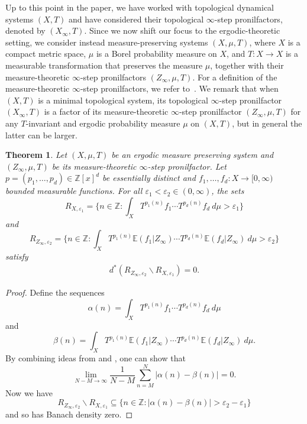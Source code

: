 \documentclass{article}
\theoremstyle{plain}
\newtheorem{theorem}[Theorem]{Theorem}
\theoremstyle{claim}
\theoremstyle{definition}
\theoremstyle{plain}
\theoremstyle{plain}
\newcommand{\Z}{\mathbb{Z}}
\renewcommand{\epsilon}{\varepsilon}
\renewcommand{\setminus}{\backslash}
\newcommand{\E}{\mathbb{E}}
\newcommand{\eps}{\epsilon}
\newcommand{\1}{\boldsymbol{1}}
\begin{document}
Up to this point in the paper, we have worked with topological dynamical systems $(X, T)$ and have considered their topological $\infty$-step pronilfactors, denoted by $(X_\infty, T)$.
Since we now shift our focus to the ergodic-theoretic setting, we consider instead measure-preserving systems $(X,\mu,T)$, where $X$ is a compact metric space, $\mu$ is a Borel probability measure on $X$, and $T\colon X\to X$ is a measurable transformation that preserves the measure $\mu$, together with their measure-theoretic $\infty$-step pronilfactors $(Z_\infty,\mu,T)$. For a definition of the measure-theoretic $\infty$-step pronilfactors, we refer to~\cite{Host_Kra18}.
We remark that when $(X,T)$ is a minimal topological system, its topological $\infty$-step pronilfactor $(X_\infty,T)$ is a factor of its measure-theoretic $\infty$-step pronilfactor $(Z_\infty,\mu,T)$ for any $T$-invariant and ergodic probability measure $\mu$ on $(X,T)$, but in general the latter can be larger.


\begin{theorem}
\label{thm_imperfect_ergodic_analogue_of_thm_a}
Let $(X, \mu, T)$ be an ergodic measure preserving system and $(Z_{\infty}, \mu, T)$ be its measure-theoretic $\infty$-step pronilfactor. Let $p = (p_1, \ldots, p_d) \in \Z[x]^d$ be essentially distinct and $f_1, \ldots, f_d: X \to [0,\infty)$ bounded measurable functions. For all $\eps_1<\eps_2\in (0,\infty)$, the sets
\[
    R_{X,\eps_1} = \bigg\{n \in \Z: \int_X T^{p_1(n)} f_1 \cdots T^{p_d(n)} f_d \ d \mu > \eps_1\bigg\}
\]
and
\[
    R_{Z_{\infty}, \eps_2} = \bigg\{n \in \Z: \int_X T^{p_1(n)} \E(f_1|Z_{\infty}) \cdots T^{p_d(n)} \E(f_d|Z_{\infty}) \ d \mu > \eps_2\bigg\}
\]
satisfy 
\begin{align}
\label{eqn_diff_of_msble_returns}
    d^*(R_{Z_{\infty}, \eps_2} \setminus R_{X,\eps_1}) = 0.
\end{align}
\end{theorem}

\begin{proof}
Define the sequences
\[
    \alpha(n) = \int_X T^{p_1(n)} f_1 \cdots T^{p_d(n)} f_d \ d \mu
\]
and
\[
    \beta(n) = \int_X T^{p_1(n)} \E(f_1|Z_{\infty}) \cdots T^{p_d(n)} \E(f_d|Z_{\infty}) \ d \mu.
\]
By combining ideas from \cite{Leibman05} and \cite{Bergelson_Host_Kra05}, one can show that
\[
    \lim_{N - M \to \infty} \frac{1}{N - M} \sum_{n=M}^N |\alpha(n) - \beta(n)| = 0.
\]
Now we have
\[
    R_{Z_{\infty}, \eps_2} \setminus R_{X,\eps_1} \subseteq \{n \in \Z: |\alpha(n) - \beta(n)| > \eps_2-\eps_1\}
\]
and so has Banach density zero.
\end{proof}
\end{document}

